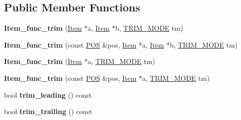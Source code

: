 \subsection*{Public Member Functions}
\begin{DoxyCompactItemize}
\item 
\mbox{\label{classItem__func__trim_a7c0af9aa8f5dfc732b0394eb23977a63}} 
{\bfseries Item\+\_\+func\+\_\+trim} (\mbox{\hyperlink{classItem}{Item}} $\ast$a, \mbox{\hyperlink{classItem}{Item}} $\ast$b, \mbox{\hyperlink{classItem__func__trim_a69d666d541f868b8499aaad03911cbf1}{T\+R\+I\+M\+\_\+\+M\+O\+DE}} tm)
\item 
\mbox{\label{classItem__func__trim_aa22ac1dd5ef34004ebd6a6e4b7bb27d4}} 
{\bfseries Item\+\_\+func\+\_\+trim} (const \mbox{\hyperlink{structYYLTYPE}{P\+OS}} \&pos, \mbox{\hyperlink{classItem}{Item}} $\ast$a, \mbox{\hyperlink{classItem}{Item}} $\ast$b, \mbox{\hyperlink{classItem__func__trim_a69d666d541f868b8499aaad03911cbf1}{T\+R\+I\+M\+\_\+\+M\+O\+DE}} tm)
\item 
\mbox{\label{classItem__func__trim_a746793f1ce170983dcfe1d14a1ebd8f3}} 
{\bfseries Item\+\_\+func\+\_\+trim} (\mbox{\hyperlink{classItem}{Item}} $\ast$a, \mbox{\hyperlink{classItem__func__trim_a69d666d541f868b8499aaad03911cbf1}{T\+R\+I\+M\+\_\+\+M\+O\+DE}} tm)
\item 
\mbox{\label{classItem__func__trim_a814308a8f2248c3611faad0657e5e84b}} 
{\bfseries Item\+\_\+func\+\_\+trim} (const \mbox{\hyperlink{structYYLTYPE}{P\+OS}} \&pos, \mbox{\hyperlink{classItem}{Item}} $\ast$a, \mbox{\hyperlink{classItem__func__trim_a69d666d541f868b8499aaad03911cbf1}{T\+R\+I\+M\+\_\+\+M\+O\+DE}} tm)
\item 
\mbox{\label{classItem__func__trim_a155a743dae93ef2c7f6d5caee9dc7e43}} 
bool {\bfseries trim\+\_\+leading} () const
\item 
\mbox{\label{classItem__func__trim_a0e1dcbb54f01a5b5e936d092cec14035}} 
bool {\bfseries trim\+\_\+trailing} () const
\item 
\mbox{\label{classItem__func__trim_ab485c3e00ab2565ceb281b3a94530b18}} 

\end{DoxyCompactItemize}
